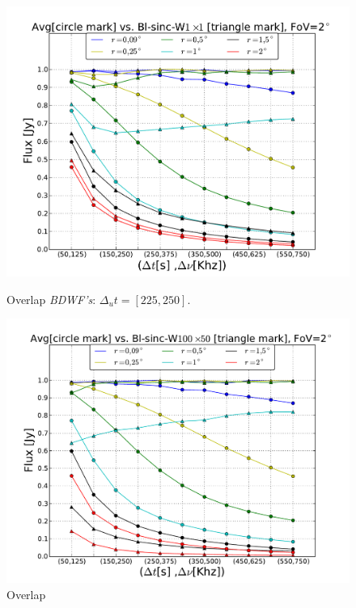 \documentclass[useAMS,usenatbib]{mn2e}
\begin{document}
\begin{figure}
  \centering
\begin{minipage}{0.45\linewidth}\includegraphics[width=1\textwidth]{./Figures/max-integ-timefreq-sinc-w1x1fov2.pdf}\caption{Overlap 
		\textit{BDWF's}: $\Delta_u t= [225, 250]$.}\label{ fig:max-integ-timefreq-sinc-w1x1fov2}\end{minipage}
\begin{minipage}{0.45\linewidth}\includegraphics[width=1\textwidth]{./Figures/max-integ-timefreq-sinc-w100x50-fov2.pdf}\caption{Overlap 
}
\end{minipage}
\end{figure}
\end{document}
